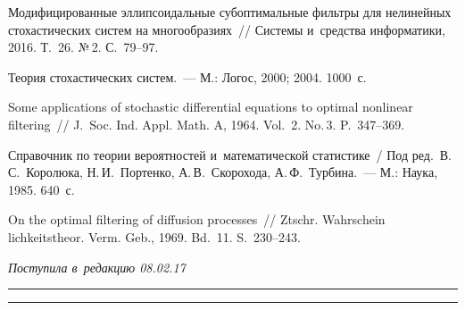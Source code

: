 \begin{multicols}{2}
{{\begin{thebibliography}{99}
Модифицированные эллипсоидальные субоптимальные фильтры 
для нелинейных стохастических систем на многообразиях~// 
Системы и~средства информатики, 2016. Т.~26. №\,2. С.~79--97.

Теория стохастических систем.~--- М.: Логос, 2000; 2004. 1000~с.

Some applications of stochastic differential equations to optimal
nonlinear filtering~// J.~Soc. Ind. Appl. Math. A, 1964.
Vol.~2. No.\,3. P.~347--369.
 
Справочник по теории вероятностей и~математической статистике~/ Под
ред.\ В.\,С.~Королюка, Н.\,И.~Портенко, А.\,В.~Скорохода, А.\,Ф.~Турбина.~--- 
М.: Наука, 1985. 640~с.

On the optimal filtering of diffusion processes~// 
Ztschr. Wahrschein lichkeitstheor. Verm. Geb., 1969. Bd.~11. S.~230--243.
 \end{thebibliography}

 }
 }

\end{multicols}

\vspace*{-3pt}

\hfill{\small\textit{Поступила в~редакцию 08.02.17}}

\vspace*{12pt}



\hrule

\vspace*{2pt}

\hrule



\def\tit{MODIFICATED ELLIPSOIDAL CONDITIONALLY OPTIMAL
FILTERS FOR NONLINEAR STOCHASTIC SYSTEMS ON~MANIFOLDS}

\def\titkol{Modificated ellipsoidal conditionally optimal
filters for nonlinear stochastic systems on~manifolds}

\def\aut{I.\,N.~Sinitsyn, V.\,I.~Sinitsyn, and~E.\,R.~Korepanov}

\def\autkol{I.\,N.~Sinitsyn, V.\,I.~Sinitsyn, and~E.\,R.~Korepanov}

